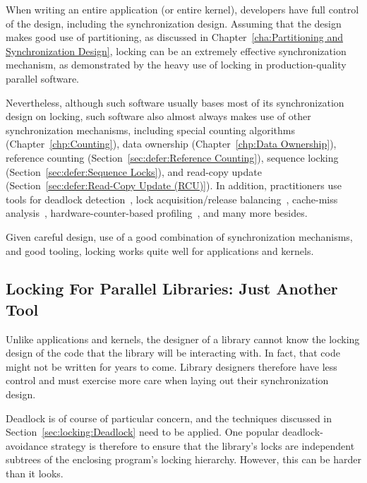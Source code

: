 When writing an entire application (or entire kernel), developers have
full control of the design, including the synchronization design.
Assuming that the design makes good use of partitioning, as discussed in
Chapter~\ref{cha:Partitioning and Synchronization Design}, locking
can be an extremely effective synchronization mechanism, as demonstrated
by the heavy use of locking in production-quality parallel software.

Nevertheless, although such software usually bases most of its
synchronization design on locking, such software also almost always
makes use of other synchronization mechanisms, including
special counting algorithms (Chapter~\ref{chp:Counting}),
data ownership (Chapter~\ref{chp:Data Ownership}),
reference counting (Section~\ref{sec:defer:Reference Counting}), 
sequence locking (Section~\ref{sec:defer:Sequence Locks}), and
read-copy update (Section~\ref{sec:defer:Read-Copy Update (RCU)}).
In addition, practitioners use tools for deadlock
detection~\cite{JonathanCorbet2006lockdep},
lock acquisition/release balancing~\cite{JonathanCorbet2004sparse},
cache-miss analysis~\cite{ValgrindHomePage},
hardware-counter-based profiling~\cite{LinuxKernelPerfWiki,OProfileHomePage},
and many more besides.

Given careful design, use of a good combination of synchronization
mechanisms, and good tooling, locking works quite well for applications
and kernels.

\subsection{Locking For Parallel Libraries: Just Another Tool}
\label{sec:locking:Locking For Parallel Libraries: Just Another Tool}

Unlike applications and kernels, the designer of a library cannot
know the locking design of the code that the library will be interacting
with.
In fact, that code might not be written for years to come.
Library designers therefore have less control and must exercise more
care when laying out their synchronization design.

Deadlock is of course of particular concern, and the techniques discussed
in Section~\ref{sec:locking:Deadlock} need to be applied.
One popular deadlock-avoidance strategy is therefore to ensure that
the library's locks are independent subtrees of the enclosing program's
locking hierarchy.
However, this can be harder than it looks.

